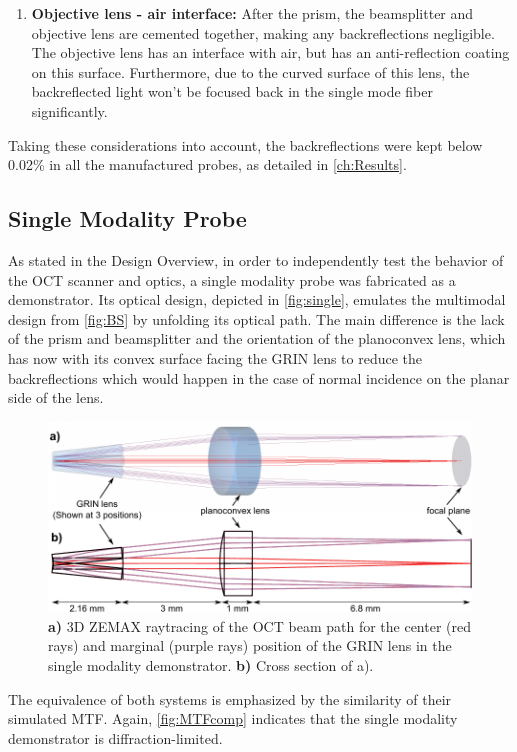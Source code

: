 \begin{enumerate}
\item \textbf{Objective lens - air interface:} After the prism, the beamsplitter and objective lens are cemented together, making any backreflections negligible. The objective lens has an interface with air, but has an anti-reflection coating on this surface. Furthermore, due to the curved surface of this lens, the backreflected light won't be focused back in the single mode fiber significantly.
\end{enumerate}

Taking these considerations into account, the backreflections were kept below 0.02\% in all the manufactured probes, as detailed in \autoref{ch:Results}.

\subsection{Single Modality Probe}
As stated in the Design Overview, in order to independently test the behavior of the OCT scanner and optics, a single modality probe was fabricated as a demonstrator. Its optical design, depicted in \autoref{fig:single}, emulates the multimodal design from \autoref{fig:BS} by unfolding its optical path. The main difference is the lack of the prism and beamsplitter and the orientation of the planoconvex lens, which has now with its convex surface facing the GRIN lens to reduce the backreflections which would happen in the case of normal incidence on the planar side of the lens.

\begin{figure}[h!]\centering
      \includegraphics[width=12cm]{figures/30_DesignSimulation/Optical/singleAll.pdf}
      \caption{\textbf{a)} 3D ZEMAX raytracing of the OCT beam path for the center (red rays) and marginal (purple rays) position of the GRIN lens in the single modality demonstrator.
      \textbf{b)} Cross section of a).}
      \label{fig:single}
\end{figure}

The equivalence of both systems is emphasized by the similarity of their simulated MTF. Again, \autoref{fig:MTFcomp} indicates that the single modality demonstrator is diffraction-limited.

